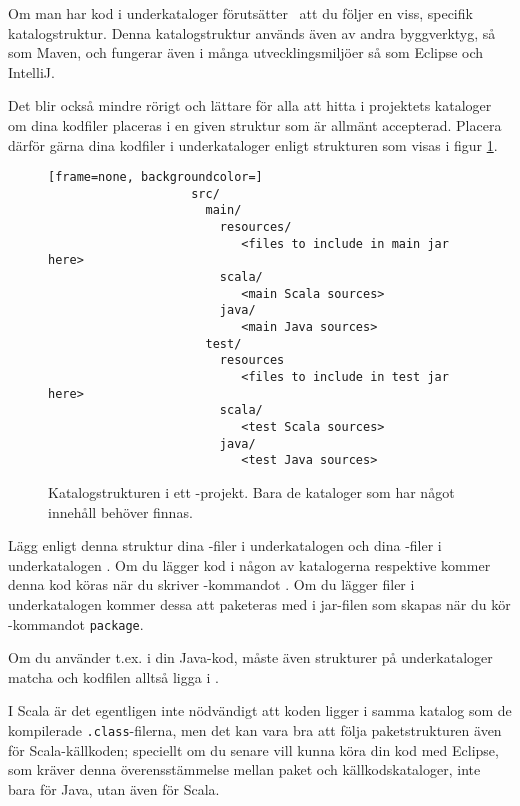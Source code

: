 Om man har kod i underkataloger förutsätter \sbt\ att du följer en viss, specifik katalogstruktur. Denna katalogstruktur används även av andra byggverktyg, så som Maven, och fungerar även i många utvecklingsmiljöer så som Eclipse och IntelliJ.

Det blir också mindre rörigt och lättare för alla att hitta i projektets kataloger om dina kodfiler placeras i en given struktur som är allmänt accepterad.
Placera därför gärna dina kodfiler i underkataloger enligt strukturen som visas i figur \ref{fig:sbt:dir-structure}.

\begin{figure}[H]
\centering

\begin{lstlisting}[frame=none, backgroundcolor=]
					src/
					  main/
					    resources/
					       <files to include in main jar here>
					    scala/
					       <main Scala sources>
					    java/
					       <main Java sources>
					  test/
					    resources
					       <files to include in test jar here>
					    scala/
					       <test Scala sources>
					    java/
					       <test Java sources>
\end{lstlisting}

\caption{Katalogstrukturen i ett \sbt-projekt. Bara de kataloger som har något innehåll behöver finnas.}
\label{fig:sbt:dir-structure}
\end{figure}

\noindent Lägg enligt denna struktur dina -filer i underkatalogen  och dina -filer i underkatalogen . Om du lägger kod i någon av katalogerna  respektive  kommer denna kod köras när du skriver \sbt-kommandot . Om du lägger filer i underkatalogen  kommer dessa att paketeras med i jar-filen som skapas när du kör \sbt-kommandot \texttt{package}.

Om du använder t.ex.  i din Java-kod, måste även strukturer på underkataloger matcha och kodfilen alltså ligga i  .

I Scala är det egentligen inte nödvändigt att koden ligger i samma katalog som de kompilerade \texttt{.class}-filerna, men det kan vara bra att följa paketstrukturen även för Scala-källkoden; speciellt om du senare vill kunna köra din kod med Eclipse, som kräver denna överensstämmelse mellan paket och källkodskataloger, inte bara för Java, utan även för Scala.

